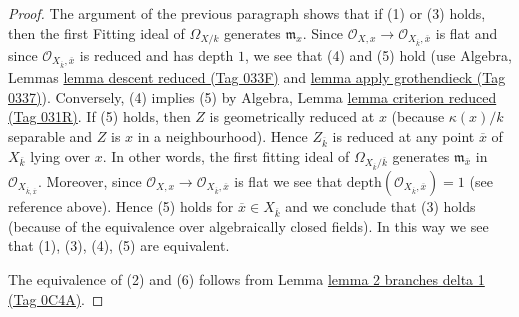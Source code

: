 \documentclass{amsart}
\theoremstyle{plain}
\theoremstyle{definition}
\theoremstyle{remark}
\numberwithin{equation}{subsection}
\begin{document}
\begin{proof}
\medskip\noindent
The argument of the previous paragraph shows that if (1) or (3) holds, then
the first Fitting ideal of $\Omega_{X/k}$ generates $\mathfrak m_x$.
Since $\mathcal{O}_{X, x} \to \mathcal{O}_{X_{\overline{k}}, \overline{x}}$
is flat and since $\mathcal{O}_{X_{\overline{k}}, \overline{x}}$
is reduced and has depth $1$, we see that (4) and (5) hold
(use Algebra, Lemmas \href{https://stacks.math.columbia.edu/tag/033F}{lemma descent reduced (Tag 033F)} and
\href{https://stacks.math.columbia.edu/tag/0337}{lemma apply grothendieck (Tag 0337)}).
Conversely, (4) implies (5) by
Algebra, Lemma \href{https://stacks.math.columbia.edu/tag/031R}{lemma criterion reduced (Tag 031R)}.
If (5) holds, then $Z$ is geometrically reduced at $x$
(because $\kappa(x)/k$ separable and $Z$ is $x$ in a neighbourhood).
Hence $Z_{\overline{k}}$ is reduced at any point $\overline{x}$
of $X_{\overline{k}}$ lying over $x$. In other words, the first
fitting ideal of $\Omega_{X_{\overline{k}}/\overline{k}}$ generates
$\mathfrak m_{\overline{x}}$ in $\mathcal{O}_{X_{\overline{k}, \overline{x}}}$.
Moreover, since
$\mathcal{O}_{X, x} \to \mathcal{O}_{X_{\overline{k}}, \overline{x}}$ is flat
we see that $\text{depth}(\mathcal{O}_{X_{\overline{k}}, \overline{x}}) = 1$
(see reference above).
Hence (5) holds for $\overline{x} \in X_{\overline{k}}$ and we
conclude that (3) holds (because of the equivalence over algebraically
closed fields). In this way we see that (1), (3), (4), (5)
are equivalent.

\medskip\noindent
The equivalence of (2) and (6) follows from
Lemma \href{https://stacks.math.columbia.edu/tag/0C4A}{lemma 2 branches delta 1 (Tag 0C4A)}.


\end{proof}
\end{document}
